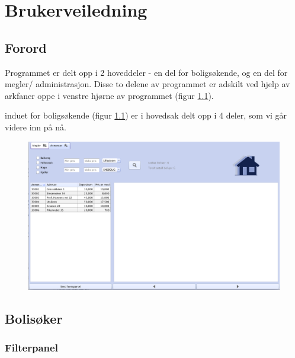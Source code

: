\chapter{Brukerveiledning}

%
%




\section{Forord}
Programmet er delt opp i 2 hoveddeler - en del for boligsøkende, og en del for megler/
administrasjon. Disse to delene av programmet er adskilt ved hjelp av arkfaner oppe i venstre
hjørne av programmet (figur \ref{fig:bv:1}).

induet for boligsøkende (figur \ref{fig:bv:1}) er i hovedsak delt opp i 4 deler, som vi går videre inn på nå.




\begin{figure}[h!]
 \includegraphics[width=\textwidth,height=\textheight,keepaspectratio]{./img/brukerveiledning/1.png}
 \caption{}
 \label{fig:bv:1}
\end{figure}





\section{Bolisøker}



\subsection{Filterpanel}

